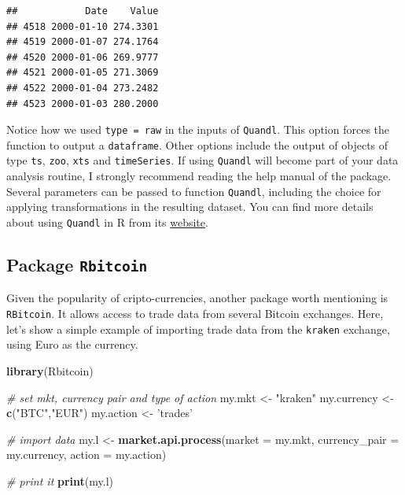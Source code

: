 \documentclass[11pt,]{book}
\newenvironment{Shaded}{\begin{snugshade}}{\end{snugshade}}
\newcommand{\KeywordTok}[1]{\textcolor[rgb]{0.27,0.27,0.27}{\textbf{#1}}}
\newcommand{\DataTypeTok}[1]{\textcolor[rgb]{0.27,0.27,0.27}{#1}}
\newcommand{\StringTok}[1]{\textcolor[rgb]{0.5,0.5,0.5}{#1}}
\newcommand{\CommentTok}[1]{\textcolor[rgb]{0.56,0.35,0.01}{\textit{#1}}}
\newcommand{\NormalTok}[1]{#1}
\begin{document}
\begin{verbatim}
##            Date    Value
## 4518 2000-01-10 274.3301
## 4519 2000-01-07 274.1764
## 4520 2000-01-06 269.9777
## 4521 2000-01-05 271.3069
## 4522 2000-01-04 273.2482
## 4523 2000-01-03 280.2000
\end{verbatim}

Notice how we used
\texttt{type\ =\ \textquotesingle{}raw\textquotesingle{}} in the inputs
of \texttt{Quandl}. This option forces the function to output a
\texttt{dataframe}. Other options include the output of objects of type
\texttt{ts}, \texttt{zoo}, \texttt{xts} and \texttt{timeSeries}. If
using \texttt{Quandl} will become part of your data analysis routine, I
strongly recommend reading the help manual of the package. Several
parameters can be passed to function \texttt{Quandl}, including the
choice for applying transformations in the resulting dataset. You can
find more details about using \texttt{Quandl} in R from its
\href{https://docs.quandl.com/docs/r}{website}.

\subsection{\texorpdfstring{Package
\texttt{Rbitcoin}}{Package Rbitcoin}}\label{package-rbitcoin}

Given the popularity of cripto-currencies, another package worth
mentioning is \texttt{RBitcoin}. It allows access to trade data from
several Bitcoin exchanges. Here, let's show a simple example of
importing trade data from the
\texttt{\textquotesingle{}kraken\textquotesingle{}} exchange, using Euro
as the currency.

\begin{Shaded}
\begin{Highlighting}[]
\KeywordTok{library}\NormalTok{(Rbitcoin)}

\CommentTok{# set mkt, currency pair and type of action}
\NormalTok{my.mkt <-}\StringTok{ "kraken"}
\NormalTok{my.currency <-}\StringTok{ }\KeywordTok{c}\NormalTok{(}\StringTok{"BTC"}\NormalTok{,}\StringTok{"EUR"}\NormalTok{)}
\NormalTok{my.action <-}\StringTok{ 'trades'}

\CommentTok{# import data}
\NormalTok{my.l <-}\StringTok{ }\KeywordTok{market.api.process}\NormalTok{(}\DataTypeTok{market =}\NormalTok{ my.mkt,}
                           \DataTypeTok{currency_pair =}\NormalTok{ my.currency,}
                           \DataTypeTok{action =}\NormalTok{ my.action)}

\CommentTok{# print it}
\KeywordTok{print}\NormalTok{(my.l)}
\end{Highlighting}
\end{Shaded}
\end{document}
